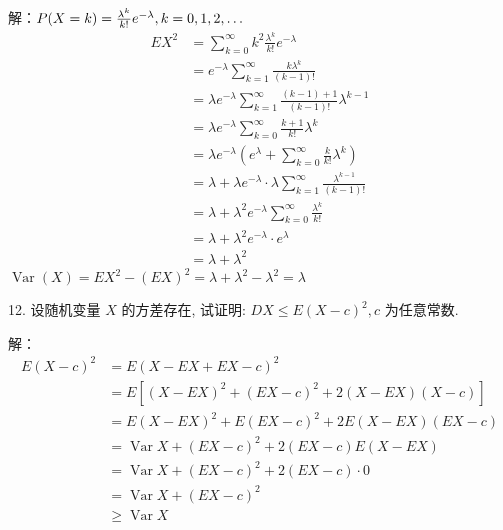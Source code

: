 \documentclass[14pt]{scrartcl} %
\numberwithin{equation}{section} %
\numberwithin{figure}{section} %
\numberwithin{table}{section} %
\begin{document}
	解：$P(X=k) =\frac{\lambda^k}{k!} e^{-\lambda}, k=0,1,2, \ldots \\$
	\[
	\begin{aligned}
		E X^2 & =\sum_{k=0}^{\infty} k^2 \frac{\lambda^k}{k!} e^{-\lambda} \\
		& =e^{-\lambda } \sum_{k=1}^{\infty} \frac{k \lambda^k}{(k-1)!} \\
		& =  \lambda e^{-\lambda} \sum_{k=1}^{\infty} \frac{(k-1)+1}{(k-1)!} \lambda^{k-1}\\
		& =\lambda e^{-\lambda} \sum_{k=0}^{\infty} \frac{k+1}{k!} \lambda^k \\
		& =\lambda e^{-\lambda}\left(e^\lambda+\sum_{k=0}^{\infty} \frac{k}{k!} \lambda^k\right) \\
		& =\lambda+\lambda e^{-\lambda} \cdot \lambda \sum_{k=1}^{\infty} \frac{\lambda^{k-1}}{(k-1)!} \\
		& =\lambda+\lambda^2 e^{-\lambda} \sum_{k=0}^{\infty} \frac{\lambda ^k}{k!} \\
		& =\lambda+\lambda^2 e^{-\lambda} \cdot e^\lambda \\
		& =\lambda+\lambda^2
	\end{aligned}
	\]
	$\operatorname{Var}(X)=E X^2-(E X)^2=\lambda+\lambda^2-\lambda^2=\lambda$
	
	12. 设随机变量 $X$ 的方差存在, 试证明: $D X \leqslant E(X-c)^{2}, c$ 为任意常数.
	
	解：
	\[
	\begin{aligned}
		E(X-c)^2 & =E(X-E X+E X-c)^2 \\
		& =E\left[(X-E X)^2+(E X-c)^2+2(X-E X)(X-c)\right] \\
		& =E(X-E X)^2+E(E X-c)^2+2 E(X-E X)(E X-c) \\
		& =\operatorname{Var} X+(E X-c)^2+2(E X - c) E(X-E X) \\
		& =\operatorname{Var} X+(E X-c)^2+2(E X-c) \cdot 0\\
		& =\operatorname{Var} X+(E X-c)^2 \\
		& \geqslant \operatorname{Var} X
	\end{aligned}
	\]
	
\end{document}
